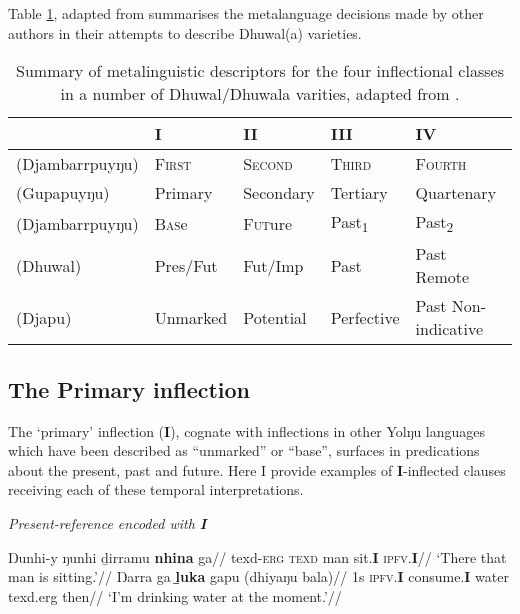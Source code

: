 Table \ref{Infl-Comparisons-Wilk}, adapted from \citet[336]{Wilkinson1991} summarises the metalanguage decisions made by other authors in their attempts to describe Dhuwal(a) varieties.

\begin{table}[h]
\begin{tabular}{l|llll}
	&	\textbf{I}	& \textbf{II}	&	\textbf{III}	&	\textbf{IV}\\\midrule
\citealt{Wilkinson1991} (Djambarrpuyŋu)&\textsc{First}&\textsc{Second}&\textsc{Third}&\textsc{Fourth}\\
\citealt{Lowe1996} (Gupapuyŋu) &Primary&Secondary&Tertiary&Quartenary\\
\citealt{Tchekhoff1983} (Djambarrpuyŋu)&\textsc{Bas}e&\textsc{Fut}ure&Past\textsubscript1&Past\textsubscript2\\
\citealt{Heath1980} (Dhuwal) & Pres/Fut & Fut/Imp & Past & Past Remote\\
\citealt{Morphy1983} (Djapu) & Unmarked & Potential & Perfective & Past Non-indicative\\
\end{tabular}
\caption{Summary of metalinguistic descriptors for the four inflectional classes in a number of Dhuwal/Dhuwala varities, adapted from \citet[336]{Wilkinson1991}.}\label{Infl-Comparisons-Wilk}
\end{table}

\subsection{The Primary inflection}

The `primary' inflection (\textbf{I}), cognate with inflections in other Yolŋu languages which have been described as ``unmarked'' or ``base'', surfaces in predications about the present, past and future. Here I provide examples of \textbf{I}-inflected clauses receiving each of these temporal interpretations.

\pex\textit{ Present-reference encoded with \textbf{I}}

\a\begingl{}
\gla Ŋunhi-y ŋunhi ḏirramu \textbf{nhina} ga//
\glb \gls{texd}\textsc{-erg} \textsc{texd} man sit.\textbf{I} \textsc{ipfv.\textbf{I}}//
\glft`There that man is sitting.'// 
\endgl
\a\begingl\gla Ŋarra ga \textbf{ḻuka} gapu (dhiyaŋu bala)//
\glb 1s \textsc{ipfv.\textbf{I}} consume.\textbf{I} water \gls{texd}.\gls{erg} then//
\glft`I'm drinking water at the moment.'\trailingcitation{[DhG 20190405]}//\endgl
\xe

